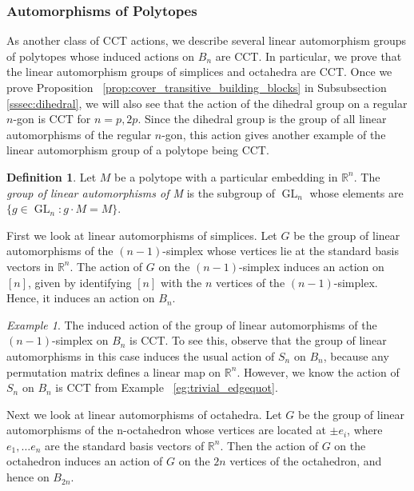 \documentclass[smallextended, envcountsame, numbook]{svjour3}
\theoremstyle{plain}
\theoremstyle{definition}
\newtheorem{defn}[thm]{Definition}
\theoremstyle{remark}
\newtheorem{eg}[thm]{Example}
\numberwithin{equation}{section}
\newcommand\sssec{\subsubsection}
\begin{document}
\sssec{Automorphisms of Polytopes}
\label{sssec:polytopes}

As another class of CCT actions, we describe several linear automorphism groups of polytopes whose induced actions on $B_n$ are CCT. In particular, we prove that the linear automorphism groups of simplices and octahedra are CCT.
Once we prove Proposition ~\ref{prop:cover_transitive_building_blocks} in Subsubsection \ref{sssec:dihedral}, we will also see that the action of the dihedral group on a regular $n$-gon is CCT for $n = p,2p$.  Since the dihedral group is the group of all linear automorphisms of the regular $n$-gon, this action gives another example of the linear automorphism group of a polytope being CCT.

\begin{defn}
Let $M$ be a polytope with a particular embedding in $\mathbb R^n$. The {\it group of linear automorphisms of M} is the subgroup of $\operatorname{GL}_n$ whose elements are $\{g \in \operatorname{GL}_n\colon g \cdot M = M\}$.
\end{defn}

First we look at linear automorphisms of simplices. Let $G$ be the group of linear automorphisms of the $(n-1)$-simplex whose vertices lie at the standard basis vectors in $\mathbb R^n$. The action of $G$ on the $(n-1)$-simplex induces an action on $[n]$, given by identifying $[n]$ with the $n$ vertices of the $(n-1)$-simplex. Hence, it induces an action on $B_n$.

\begin{eg}
The induced action of the group of linear automorphisms of the $(n-1)$-simplex on $B_n$ is CCT. To see this, observe that the group of linear automorphisms in this case induces the usual action of $S_n$ on $B_n$, because any permutation matrix defines a linear map on $\mathbb R^n$. However, we know the action of $S_n$ on $B_n$ is CCT from Example ~\ref{eg:trivial_edgequot}.
\end{eg}

Next we look at linear automorphisms of octahedra. Let $G$ be the group of linear automorphisms of the n-octahedron whose vertices are located at $\pm e_i$, where $e_1,\ldots e_n$ are the standard basis vectors of $\mathbb R^n$. Then the action of $G$ on the octahedron induces an action of $G$ on the $2n$ vertices of the octahedron, and hence on $B_{2n}$.
\end{document}
